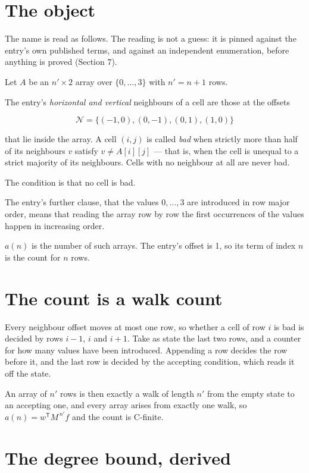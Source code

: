 \documentclass[11pt]{article}
\theoremstyle{definition}
\begin{document}
\section{The object}

The name is read as follows. The reading is not a guess: it is pinned against the entry's own published terms, and against an independent enumeration, before anything is proved (Section 7).

Let $A$ be an $n' \times 2$ array over $\{0,\dots,3\}$ with $n' = n + 1$ rows.

The entry's {\itshape horizontal and vertical} neighbours of a cell are those at the offsets

\[\mathcal{N} = \{(-1,0), (0,-1), (0,1), (1,0)\}\]

that lie inside the array. A cell $(i,j)$ is called {\itshape bad} when strictly more than half of its neighbours $v$ satisfy $v \ne A[i][j]$ --- that is, when the cell is unequal to a strict majority of its neighbours. Cells with no neighbour at all are never bad.

The condition is that no cell is bad.

The entry's further clause, that the values $0,\dots,3$ are introduced in row major order, means that reading the array row by row the first occurrences of the values happen in increasing order.

$a(n)$ is the number of such arrays. The entry's offset is 1, so its term of index $n$ is the count for $n$ rows.

\section{The count is a walk count}

Every neighbour offset moves at most one row, so whether a cell of row $i$ is bad is decided by rows $i-1$, $i$ and $i+1$. Take as state the last two rows, and a counter for how many values have been introduced. Appending a row decides the row before it, and the last row is decided by the accepting condition, which reads it off the state.

An array of $n'$ rows is then exactly a walk of length $n'$ from the empty state to an accepting one, and every array arises from exactly one walk, so $a(n) = w^{\mathsf T}M^{\,n'}f$ and the count is C-finite.

\section{The degree bound, derived}
\end{document}
